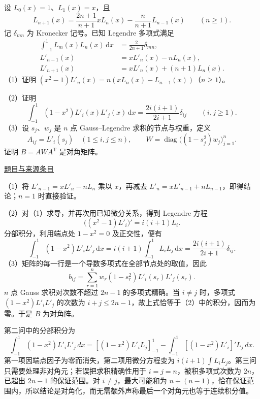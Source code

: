\documentclass[UTF8,12pt,a4paper,fontset=fandol]{ctexart}
\begin{document}
\begin{example}\label{ex:fin16-high:13}\label{pr:fin16-high:13}

设 $L_0(x)=1$、$L_1(x)=x$，且
\[
L_{n+1}(x)=\frac{2n+1}{n+1}xL_n(x)-\frac{n}{n+1}L_{n-1}(x)
\qquad(n\ge1).
\]
记 $\delta_{mn}$ 为 Kronecker 记号。已知 Legendre 多项式满足
\[
\begin{aligned}
\int_{-1}^1L_m(x)L_n(x)\,\mathrm dx&=\frac{2}{2n+1}\delta_{mn},\\
L'_{n-1}(x)&=xL'_n(x)-nL_n(x),\\
L'_{n+1}(x)&=xL'_n(x)+(n+1)L_n(x).
\end{aligned}
\]
（1）证明 $(x^2-1)L'_n(x)=n(xL_n(x)-L_{n-1}(x))$（$n\ge1$）。

（2）证明
\[
\int_{-1}^1(1-x^2)L'_i(x)L'_j(x)\,\mathrm dx
=\frac{2i(i+1)}{2i+1}\delta_{ij}\qquad(i,j\ge1).
\]
（3）设 $s_j$、$w_j$ 是 $n$ 点 Gauss--Legendre 求积的节点与权重，定义
\[
A_{ij}=L'_i(s_j)\quad(1\le i,j\le n),\qquad
W=\operatorname{diag}\bigl((1-s_j^2)w_j\bigr)_{j=1}^n.
\]
证明 $B=AWA^{\mathrm T}$ 是对角矩阵。

\par\href{https://github.com/lzxcr/cmc-mathematics/blob/64916fa1fdbc3e444a652eca204d5669058ee321/src/problems/finals/16/16.md}{题目与来源条目}

\end{example}

\begin{solve}\label{ans:fin16-high:13}

（1）将 $L'_{n-1}=xL'_n-nL_n$ 乘以 $x$，再减去 $L'_n=xL'_{n-1}+nL_{n-1}$，即得结论；$n=1$ 时直接验证。

（2）对（1）求导，并再次用已知微分关系，得到 Legendre 方程
\[
\bigl((x^2-1)L'_i\bigr)'=i(i+1)L_i.
\]
分部积分，利用端点处 $1-x^2=0$ 及正交性，便有
\[
\int_{-1}^1(1-x^2)L'_iL'_j\,\mathrm dx
=i(i+1)\int_{-1}^1L_iL_j\,\mathrm dx
=\frac{2i(i+1)}{2i+1}\delta_{ij}.
\]
（3）矩阵的每一行是一个导数多项式在全部节点处的取值，因此
\[
b_{ij}=\sum_{r=1}^nw_r(1-s_r^2)L'_i(s_r)L'_j(s_r).
\]
$n$ 点 Gauss 求积对次数不超过 $2n-1$ 的多项式精确。当 $i\ne j$ 时，多项式 $(1-x^2)L'_iL'_j$ 的次数为 $i+j\le2n-1$，故上式恰等于（2）中的积分，因而为零。于是 $B$ 为对角阵。

第二问中的分部积分为
\[
\int_{-1}^1(1-x^2)L'_iL'_j\,dx
=[(1-x^2)L'_iL_j]_{-1}^1-\int_{-1}^1[(1-x^2)L'_i]'L_j\,dx.
\]
第一项因端点因子为零而消失，第二项用微分方程变为 $i(i+1)\int L_iL_j$。第三问只需要处理非对角元；若误把求积精确性用于 $i=j=n$，被积多项式次数为 $2n$，已超出 $2n-1$ 的保证范围。对 $i\ne j$，最大可能和为 $n+(n-1)$，恰在保证范围内，所以结论是对角化，而无需额外声称最后一个对角元也等于连续积分值。

\end{solve}
\end{document}
